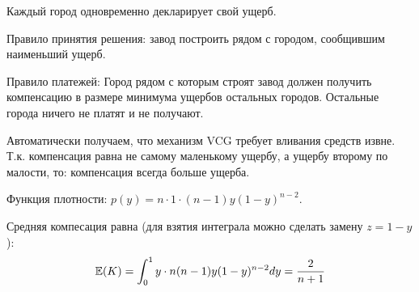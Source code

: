 \begin{enumerate}
Каждый город одновременно декларирует свой ущерб. 

Правило принятия решения: завод построить рядом с городом, сообщившим наименьший ущерб.

Правило платежей: Город рядом с которым строят завод должен получить компенсацию в размере минимума ущербов остальных городов. Остальные города ничего не платят и не получают. 

Автоматически получаем, что механизм VCG требует вливания средств извне. Т.к. компенсация равна не самому маленькому ущербу, а ущербу второму по малости, то: компенсация всегда больше ущерба.

Функция плотности: $ p(y)=n\cdot 1\cdot (n-1)y(1-y)^{n-2} $.

Средняя компесация равна (для взятия интеграла можно сделать замену $ z=1-y $): 
\begin{equation}
\mathbb{E}(K)=\int_{0}^{1}y\cdot n(n-1)y(1-y)^{n-2}dy=\frac{2}{n+1}
\end{equation}








\end{enumerate}
